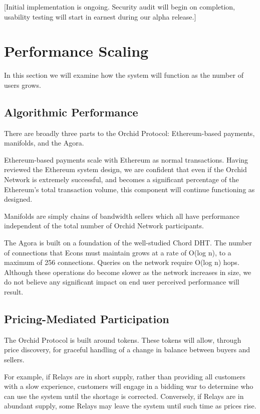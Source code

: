 \documentclass{article}
\newcommand{\orchid}{Orchid}
\newcommand{\Orchid}{\orchid}
\begin{document}
[Initial implementation is ongoing. Security audit will begin on
  completion, usability testing will start in earnest during our alpha
  release.]

\section{Performance Scaling}
\label{sec:performance}

In this section we will examine how the system will function as the
number of users grows.

\subsection{Algorithmic Performance}

There are broadly three parts to the \Orchid{} Protocol: Ethereum-based
payments, manifolds, and the Agora.

Ethereum-based payments scale with Ethereum as normal transactions.
Having reviewed the Ethereum system design, we are confident that even
if the \Orchid{} Network is extremely successful, and becomes a
significant percentage of the Ethereum's total transaction volume,
this component will continue functioning as designed.

Manifolds are simply chains of bandwidth sellers which all have
performance independent of the total number of \Orchid{} Network
participants.

The Agora is built on a foundation of the well-studied Chord DHT. The
number of connections that Econs must maintain grows at a rate of
O(log n), to a maximum of 256 connections. Queries on the network
require O(log n) hops. Although these operations do become slower as
the network increases in size, we do not believe any significant
impact on end user perceived performance will result.

\subsection{Pricing-Mediated Participation}

The \Orchid{} Protocol is built around tokens. These tokens will allow,
through price discovery, for graceful handling of a change in balance
between buyers and sellers.

For example, if Relays are in short supply, rather than providing all
customers with a slow experience, customers will engage in a bidding
war to determine who can use the system until the shortage is
corrected. Conversely, if Relays are in abundant supply, some Relays
may leave the system until such time as prices rise.
\end{document}
